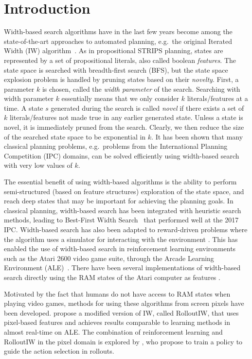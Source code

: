 \section{Introduction}
Width-based search algorithms have in the last few years become among the state-of-the-art approaches to  automated planning, e.g.\ the original Iterated Width (IW) algorithm~\cite{iworginal}. As in propositional STRIPS planning, states are represented by a set of propositional literals, also called boolean \emph{features}. The state space is searched with breadth-first search (BFS), but the state space explosion problem is handled by pruning states based on their \emph{novelty}. First, a parameter $k$ is chosen, called the \emph{width parameter} of the search. Searching with width parameter $k$ essentially means that we only consider $k$ literals/features at a time. A state $s$ generated during the search is called \emph{novel} if there exists a set of $k$ literals/features not made true in any earlier generated state. Unless a state is novel, it is immediately pruned from the search. Clearly, we then reduce the size of the searched state space to be exponential in $k$. It has been shown that many classical planning problems, e.g.\ problems from the International Planning Competition (IPC) domains, can be solved efficiently using width-based search with very low values of $k$.  

The essential benefit of using width-based algorithms is the ability to perform semi-structured (based on feature structures) exploration of the state space, and reach deep states that may be important for achieving the planning goals. In classical planning, width-based search has been integrated with heuristic search methods, leading to Best-First Width Search~\cite{BFSW} that performed well at the 2017 IPC. Width-based search has also been adapted to reward-driven problems where the algorithm uses a simulator for interacting with the environment \cite{ijcai2017-600}. This has enabled the use of width-based search in reinforcement learning environments such as the Atari 2600 video game suite, through the Arcade Learning Environment (ALE)~\cite{DBLP:journals/corr/abs-1207-4708}. There have been several implementations of width-based search directly using the RAM states of the Atari computer as features \cite{ram_model,ram_IW_shleyfman,dominatedSequnce}.

Motivated by the fact that humans do not have access to RAM states when playing video games, methods for using these algorithms from screen pixels have been developed. \citet{rolloutiw-orginal} propose a modified version of IW, called RolloutIW, that uses pixel-based features and achieves results comparable to learning methods in almost real-time on ALE. The combination of reinforcement learning and RolloutIW in the pixel domain is explored by \citet{RLIW}, who propose to train a policy to guide the action selection in rollouts. 

